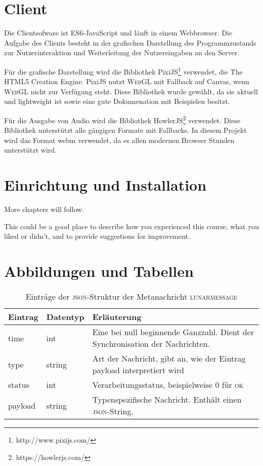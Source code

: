 \documentclass[ngerman,11pt]{report}
\begin{document}
\chapter{Client}

Die Clientsofware ist ES6-JavaScript und läuft in einem Webbrowser. Die Aufgabe
des Clients besteht in der grafischen Darstellung des Programmzustands zur
Nutzerinteraktion und Weiterleitung der Nutzereingaben an den Server.

Für die grafische Darstellung wird die Bibliothek PixiJS\footnote{http://www.pixijs.com/}
verwendet, die \glqq The HTML5 Creation Engine\grqq. PixiJS nutzt \textsc{WebGL} mit
Fallback auf Canvas, wenn \textsc{WebGL} nicht zur Verfügung steht. Diese Bibliothek
wurde gewählt, da sie aktuell und lightweight ist sowie  eine gute Dokumenation mit
Beispielen besitzt.

Für die Ausgabe von Audio wird die Bibliothek HowlerJS\footnote{https://howlerjs.com/}
verwendet. Diese Bibliothek unterstützt alle gängigen Formate mit Fallbacks. In
diesem Projekt wird das Format webm verwendet, da es allen modernen Browser Stunden
unterstützt wird.

\chapter{Einrichtung und Installation}

More chapters will follow.


This could be a good place to describe how you experienced this course, what you liked or didn't, and to provide suggestions for improvement.

\chapter{Abbildungen und Tabellen}

\begin{table}[]
\centering
\caption{Einträge der \textsc{json}-Struktur der Metanachricht \textsc{lunarmessage}}
\label{table:lunarmessage}
\begin{tabularx}{\textwidth}{l|l|X}
Eintrag & Datentyp & Erläuterung \\ \hline
time    & int    & Eine bei null beginnende Ganzzahl. Dient der Synchronisation der Nachrichten. \\
type    & string & Art der Nachricht, gibt an, wie der Eintrag payload interpretiert wird  \\
status  & int    & Verarbeitungsstatus, beispielweise 0 für \textsc{ok}                          \\
payload & string & Typenspezifische Nachricht. Enthält einen \textsc{json}-String.       
\end{tabularx}
\end{table}
\end{document}
